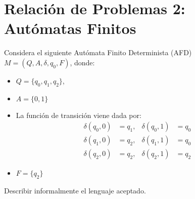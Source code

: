 \section{Relación de Problemas 2: Autómatas Finitos}

\begin{ejercicio}
Considera el siguiente Autómata Finito Determinista (AFD) $M = (Q,A, \delta, q_0, F )$, donde:
\begin{itemize}
    \item $Q = \{q_0, q_1, q_2\}$,
    \item $A = \{0, 1\}$
    \item La función de transición viene dada por:
    \begin{align*}
    \delta(q_0, 0) &= q_1, & \delta(q_0, 1) &= q_0 \\
    \delta(q_1, 0) &= q_2, & \delta(q_1, 1) &= q_0 \\
    \delta(q_2, 0) &= q_2, & \delta(q_2, 1) &= q_2
    \end{align*}
    \item $F = \{q_2\}$
\end{itemize}
Describir informalmente el lenguaje aceptado.
\end{ejercicio}

